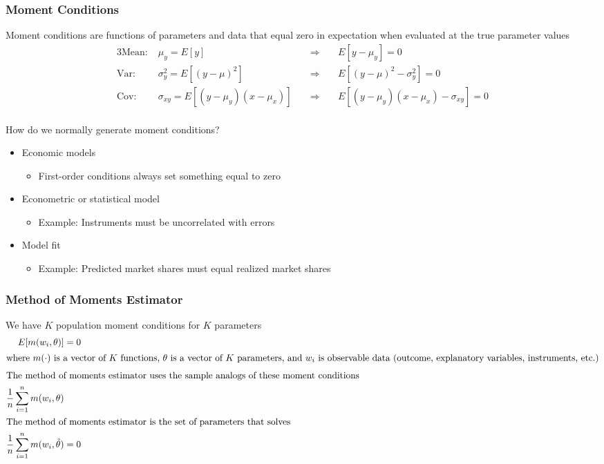\documentclass{beamer}
\begin{document}
\begin{frame}\frametitle{Moment Conditions}
    Moment conditions are functions of parameters and data that equal zero in expectation when evaluated at the true parameter values
    \begin{alignat*}{3}
    	\text{Mean:} \; &\mu_y = E[y] \; &&\Rightarrow \; &&E[y - \mu_y] = 0 \\
    	\text{Var:} \; &\sigma_y^2 = E[(y - \mu)^2] \; &&\Rightarrow \; &&E[ (y - \mu)^2 - \sigma_y^2] = 0 \\
    	\text{Cov:} \; &\sigma_{xy} = E[(y - \mu_y) (x - \mu_x)] \; &&\Rightarrow \; &&E[ (y - \mu_y) (x - \mu_x) - \sigma_{xy}] = 0
    \end{alignat*} \\
    \vspace{2ex}
    How do we normally generate moment conditions?
    \begin{itemize}
    	\item Economic models
    	\begin{itemize}
    		\item First-order conditions always set something equal to zero
    	\end{itemize}
    	\item Econometric or statistical model
    	\begin{itemize}
    		\item Example: Instruments must be uncorrelated with errors
    	\end{itemize}
    	\item Model fit
    	\begin{itemize}
    		\item Example: Predicted market shares must equal realized market shares
    	\end{itemize}
    \end{itemize}
\end{frame}

\begin{frame}\frametitle{Method of Moments Estimator}
    We have $K$ population moment conditions for $K$ parameters
    \begin{align*}
    	E[m(w_i, \theta)] &= 0 \\
    	\intertext{where $m(\cdot)$ is a vector of $K$ functions, $\theta$ is a vector of $K$ parameters, and $w_i$ is observable data (outcome, explanatory variables, instruments, etc.)}
    	\intertext{The method of moments estimator uses the sample analogs of these moment conditions }
    	\frac{1}{n} \sum_{i = 1}^n m(w_i, \theta) & \\
    	\intertext{The method of moments estimator is the set of parameters that solves}
    	\frac{1}{n} \sum_{i = 1}^n m(w_i, \hat{\theta}) &= 0
    \end{align*}
\end{frame}
\end{document}
